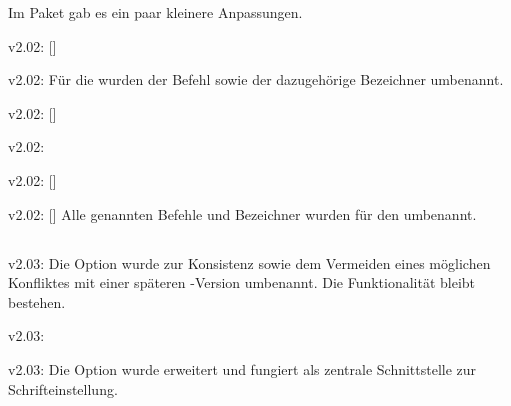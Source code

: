 Im Paket  gab es ein paar kleinere Anpassungen.
\begin{Bundle}{}
\begin{Obsolete}{v2.02:}{%
  []%
}
\begin{Obsolete}{v2.02:}{}
\printobsoletelist%
%
Für die \taskname{} wurden der Befehl sowie der dazugehörige Bezeichner 
umbenannt.
\end{Obsolete}
\end{Obsolete}

\begin{Obsolete}{v2.02:}{%
  []%
}
\begin{Obsolete}{v2.02:}{}
\begin{Obsolete}{v2.02:}{%
  []%
}
\begin{Obsolete}{v2.02:}{%
  []%
}
\printobsoletelist%
%
Alle genannten Befehle und Bezeichner wurden für den \noticename{} umbenannt.
\end{Obsolete}
\end{Obsolete}
\end{Obsolete}
\end{Obsolete}
\end{Bundle}


\subsection{}
\begin{Obsolete}{v2.03:}{}
\printobsoletelist%
%
Die Option  wurde zur Konsistenz sowie dem Vermeiden 
eines möglichen Konfliktes mit einer späteren \KOMAScript-Version umbenannt. 
Die Funktionalität bleibt bestehen.
\end{Obsolete}

\begin{Obsolete}{v2.03:}{}
\begin{Obsolete}{v2.03:}{}
\printobsoletelist%
%
Die Option  wurde erweitert und fungiert als zentrale 
Schnittstelle zur Schrifteinstellung. 
\end{Obsolete}
\end{Obsolete}

